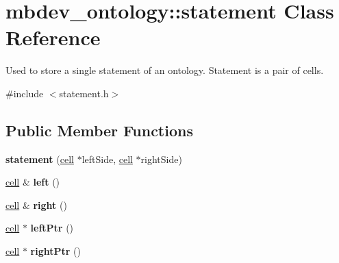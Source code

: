 \hypertarget{classmbdev__ontology_1_1statement}{\section{mbdev\-\_\-ontology\-:\-:statement \-Class \-Reference}
\label{classmbdev__ontology_1_1statement}
}


\-Used to store a single statement of an ontology. \-Statement is a pair of cells.  




{\ttfamily \#include $<$statement.\-h$>$}

\subsection*{\-Public \-Member \-Functions}
\begin{DoxyCompactItemize}
\item 
\hypertarget{classmbdev__ontology_1_1statement_a29debd9185df2ae9c4a26e2631d64060}{{\bfseries statement} (\hyperlink{classmbdev__ontology_1_1cell}{cell} $\ast$left\-Side, \hyperlink{classmbdev__ontology_1_1cell}{cell} $\ast$right\-Side)}\label{classmbdev__ontology_1_1statement_a29debd9185df2ae9c4a26e2631d64060}

\item 
\hypertarget{classmbdev__ontology_1_1statement_a5d20463fc12a458be62b0d70ee5259fd}{\hyperlink{classmbdev__ontology_1_1cell}{cell} \& {\bfseries left} ()}\label{classmbdev__ontology_1_1statement_a5d20463fc12a458be62b0d70ee5259fd}

\item 
\hypertarget{classmbdev__ontology_1_1statement_ae06d865de61bb924b8b1827d1b301ae4}{\hyperlink{classmbdev__ontology_1_1cell}{cell} \& {\bfseries right} ()}\label{classmbdev__ontology_1_1statement_ae06d865de61bb924b8b1827d1b301ae4}

\item 
\hypertarget{classmbdev__ontology_1_1statement_ac4ab8b4d7fa0c6b42c33f04490c33e76}{\hyperlink{classmbdev__ontology_1_1cell}{cell} $\ast$ {\bfseries left\-Ptr} ()}\label{classmbdev__ontology_1_1statement_ac4ab8b4d7fa0c6b42c33f04490c33e76}

\item 
\hypertarget{classmbdev__ontology_1_1statement_af1a1d7dd1c299aea445765a3fd65dc14}{\hyperlink{classmbdev__ontology_1_1cell}{cell} $\ast$ {\bfseries right\-Ptr} ()}\label{classmbdev__ontology_1_1statement_af1a1d7dd1c299aea445765a3fd65dc14}

\end{DoxyCompactItemize}
